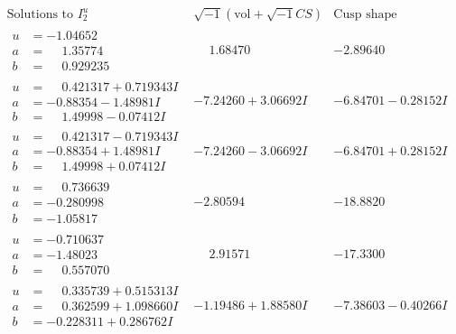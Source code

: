 \documentclass[1p]{elsarticle_modified}
\theoremstyle{definition}
\newcommand{\I}{\sqrt{-1}}
\begin{document}
$$\begin{array}{c|c|c}  
\text{Solutions to }I^u_{2}& \I (\text{vol} + \sqrt{-1}CS) & \text{Cusp shape}\\
 \hline 
\begin{aligned}
u &= -1.04652\phantom{ +0.000000I} \\
a &= \phantom{-}1.35774\phantom{ +0.000000I} \\
b &= \phantom{-}0.929235\phantom{ +0.000000I}\end{aligned}
 & \phantom{-}1.68470\phantom{ +0.000000I} & -2.89640\phantom{ +0.000000I} \\ \hline\begin{aligned}
u &= \phantom{-}0.421317 + 0.719343 I \\
a &= -0.88354 - 1.48981 I \\
b &= \phantom{-}1.49998 - 0.07412 I\end{aligned}
 & -7.24260 + 3.06692 I & -6.84701 - 0.28152 I \\ \hline\begin{aligned}
u &= \phantom{-}0.421317 - 0.719343 I \\
a &= -0.88354 + 1.48981 I \\
b &= \phantom{-}1.49998 + 0.07412 I\end{aligned}
 & -7.24260 - 3.06692 I & -6.84701 + 0.28152 I \\ \hline\begin{aligned}
u &= \phantom{-}0.736639\phantom{ +0.000000I} \\
a &= -0.280998\phantom{ +0.000000I} \\
b &= -1.05817\phantom{ +0.000000I}\end{aligned}
 & -2.80594\phantom{ +0.000000I} & -18.8820\phantom{ +0.000000I} \\ \hline\begin{aligned}
u &= -0.710637\phantom{ +0.000000I} \\
a &= -1.48023\phantom{ +0.000000I} \\
b &= \phantom{-}0.557070\phantom{ +0.000000I}\end{aligned}
 & \phantom{-}2.91571\phantom{ +0.000000I} & -17.3300\phantom{ +0.000000I} \\ \hline\begin{aligned}
u &= \phantom{-}0.335739 + 0.515313 I \\
a &= \phantom{-}0.362599 + 1.098660 I \\
b &= -0.228311 + 0.286762 I\end{aligned}
 & -1.19486 + 1.88580 I & -7.38603 - 0.40266 I \\ \hline\begin{aligned}

\end{aligned}
\end{array}$$
\end{document}
